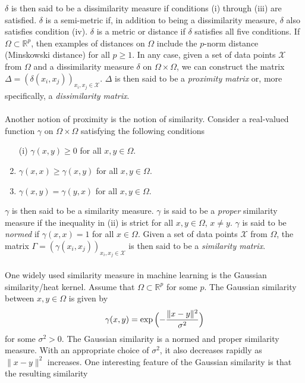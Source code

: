 $\delta$ is then said to be a dissimilarity measure if conditions (i)
through (iii) are satisfied. $\delta$ is a semi-metric if, in addition
to being a dissimilarity measure, $\delta$ also satisfies condition
(iv). $\delta$ is a metric or distance if $\delta$ satisfies all five
conditions. If $\Omega \subset \mathbb{R}^{p}$, then examples of
distances on $\Omega$ include the $p$-norm distance (Minskowski
distance) for all $p \geq 1$. In any case, given a set of data points
$\mathcal{X}$ from $\Omega$ and a dissimilarity measure $\delta$ on
$\Omega \times \Omega$, we can construct the matrix $\Delta =
(\delta(x_i,x_j))_{x_i,x_j \in \mathcal{X}}$. $\Delta$ is then said to
be a \emph{proximity matrix} or, more specifically, a \emph{dissimilarity
  matrix}. \\ \\
%
%
\noindent
Another notion of proximity is the notion of similarity. Consider a
real-valued function $\gamma$ on $\Omega \times \Omega$ satisfying the
following conditions
\begin{enumerate}
\item[(i)] $\gamma(x,y) \geq 0$ for all $x,y \in \Omega$.
\item $\gamma(x,x) \geq \gamma(x,y)$ for all $x,y \in \Omega$.
\item $\gamma(x,y) = \gamma(y,x)$ for all $x,y \in \Omega$.
\end{enumerate}
$\gamma$ is then said to be a similarity measure. $\gamma$ is said to
be a \emph{proper} similarity measure if the inequality in (ii) is strict for
all $x,y \in \Omega$, $x \not = y$. $\gamma$ is said to be
\emph{normed} if $\gamma(x,x) = 1$ for all $x \in \Omega$. Given a set
of data points $\mathcal{X}$ from $\Omega$, the matrix $\Gamma =
(\gamma(x_i,x_j))_{x_i,x_j \in \mathcal{X}}$ is then said to be a
\emph{similarity matrix}. \\ \\
%
%
\noindent One widely used similarity measure in machine learning is the Gaussian
similarity/heat kernel. Assume that $\Omega \subset \mathbb{R}^{p}$
for some $p$. The Gaussian similarity between $x,y \in \Omega$ is
given by
\begin{equation}
  \label{eq:100}
  \gamma(x,y) = \exp{\Bigl(-\frac{\|x - y\|^{2}}{\sigma^2}\Bigr)}
\end{equation}
for some $\sigma^2 > 0$. The Gaussian similarity is a normed and
proper similarity measure. With an appropriate choice of $\sigma^2$,
it also decreases rapidly as $\|x - y\|^2$ increases. One interesting
feature of the Gaussian similarity is that the resulting similarity

